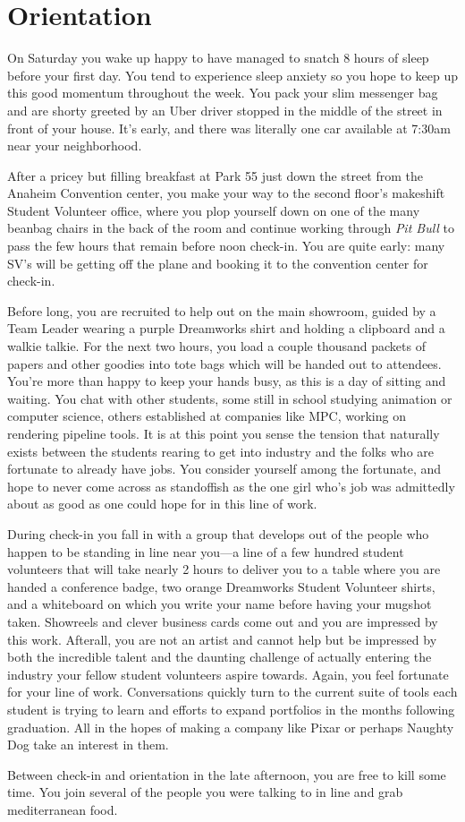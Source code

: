 \documentclass[../main.tex]{subfiles}
\begin{document}
\section{Orientation}

On Saturday you wake up happy to have managed to snatch 8 hours of sleep before your first day. You tend to experience sleep anxiety so you hope to keep up this good momentum throughout the week. You pack your slim messenger bag and are shorty greeted by an Uber driver stopped in the middle of the street in front of your house. It's early, and there was literally one car available at 7:30am near your neighborhood.

After a pricey but filling breakfast at Park 55 just down the street from the Anaheim Convention center, you make your way to the second floor's makeshift Student Volunteer office, where you plop yourself down on one of the many beanbag chairs in the back of the room and continue working through \textit{Pit Bull} to pass the few hours that remain before noon check-in. You are quite early: many SV's will be getting off the plane and booking it to the convention center for check-in.

Before long, you are recruited to help out on the main showroom, guided by a Team Leader wearing a purple Dreamworks shirt and holding a clipboard and a walkie talkie. For the next two hours, you load a couple thousand packets of papers and other goodies into tote bags which will be handed out to attendees. You're more than happy to keep your hands busy, as this is a day of sitting and waiting. You chat with other students, some still in school studying animation or computer science, others established at companies like MPC, working on rendering pipeline tools. It is at this point you sense the tension that naturally exists between the students rearing to get into industry and the folks who are fortunate to already have jobs. You consider yourself among the fortunate, and hope to never come across as standoffish as the one girl who's job was admittedly about as good as one could hope for in this line of work.

During check-in you fall in with a group that develops out of the people who happen to be standing in line near you---a line of a few hundred student volunteers that will take nearly 2 hours to deliver you to a table where you are handed a conference badge, two orange Dreamworks Student Volunteer shirts, and a whiteboard on which you write your name before having your mugshot taken. Showreels and clever business cards come out and you are impressed by this work. Afterall, you are not an artist and cannot help but be impressed by both the incredible talent and the daunting challenge of actually entering the industry your fellow student volunteers aspire towards. Again, you feel fortunate for your line of work. Conversations quickly turn to the current suite of tools each student is trying to learn and efforts to expand portfolios in the months following graduation. All in the hopes of making a company like Pixar or perhaps Naughty Dog take an interest in them.

Between check-in and orientation in the late afternoon, you are free to kill some time. You join several of the people you were talking to in line and grab mediterranean food.
\end{document}
